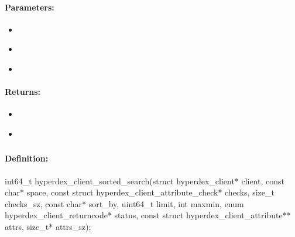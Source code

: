\paragraph{Parameters:}
\begin{itemize}[noitemsep]
\item {}\\

\item {}\\

\item {}\\

\end{itemize}

\paragraph{Returns:}
\begin{itemize}[noitemsep]
\item {}\\

\item {}\\

\end{itemize}

\pagebreak
\subsubsection{}
\label{api:c:sorted_search}


\paragraph{Definition:}
\begin{ccode}
int64_t hyperdex_client_sorted_search(struct hyperdex_client* client,
        const char* space,
        const struct hyperdex_client_attribute_check* checks, size_t checks_sz,
        const char* sort_by,
        uint64_t limit,
        int maxmin,
        enum hyperdex_client_returncode* status,
        const struct hyperdex_client_attribute** attrs, size_t* attrs_sz);
\end{ccode}


